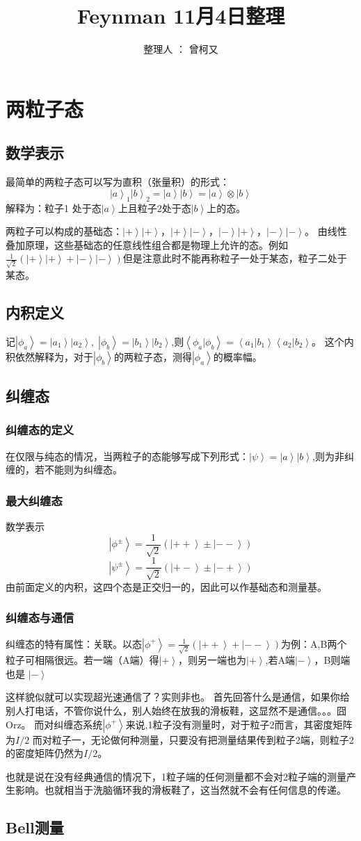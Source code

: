 \documentclass[11pt,a4paper,nocap]{ctexart}
\title{Feynman 11月4日整理}
\author{整理人 ：  曾柯又}
\date{\vspace{-5ex}}
\newcommand{\ket}[1]{\left|#1\right>}
\newcommand{\braket}[2]{\left<#1|#2\right>}
\begin{document}
\maketitle
\section{两粒子态}
\subsection{数学表示}
最简单的两粒子态可以写为直积（张量积）的形式：\[\left|a\right>_1\left|b\right>_2 = \left|a\right>\left|b\right> = \left|a\right>\otimes\left|b\right> \]
解释为：粒子1 处于态\(\left|a\right>\)上且粒子2处于态\(\left|b\right>\)上的态。

两粒子可以构成的基础态：\(\left|+\right>\left|+\right>，\left|+\right>\left|-\right>，\left|-\right>\left|+\right>，\left|-\right>\left|-\right>\)。
由线性叠加原理，这些基础态的任意线性组合都是物理上允许的态。例如\(\frac{1}{\sqrt{2}}(\left|+\right>\left|+\right> + \left|-\right>\left|-\right>)\)但是注意此时不能再称粒子一处于某态，粒子二处于某态。
\subsection{内积定义}
记\(\left|\phi_a\right> = \left|a_1\right>\left|a_2\right>,\;\left|\phi_b\right> = \ket{b_1}\ket{b_2}\),则\(\braket{\phi_a}{\phi_b} = \braket{a_1}{b_1}\braket{a_2}{b_2}\)。
这个内积依然解释为，对于\(\left|\phi_b\right>\)的两粒子态，测得\(\left|\phi_a\right>\)的概率幅。
\subsection{纠缠态}
\subsubsection{纠缠态的定义}
在仅限与纯态的情况，当两粒子的态能够写成下列形式：\(\ket{\psi} = \ket{a}\ket{b}\),则为非纠缠的，若不能则为纠缠态。
\subsubsection{最大纠缠态}
数学表示\[\ket{\phi^\pm} = \frac{1}{\sqrt{2}}(\ket{++} \pm \ket{--})\]
\[\ket{\psi^\pm} = \frac{1}{\sqrt{2}}(\ket{+-} \pm \ket{-+})\]
由前面定义的内积，这四个态是正交归一的，因此可以作基础态和测量基。\\
\subsubsection{纠缠态与通信}
纠缠态的特有属性：关联。以态\(\ket{\phi^+} = \frac{1}{\sqrt{2}}(\ket{++} + \ket{--})\)为例：A,B两个粒子可相隔很远。若一端（A端）得\(\ket{+}\)，则另一端也为\(\ket{+}\),若A端\(\ket{-}\)，B则端也是
\(\ket{-}\)

这样貌似就可以实现超光速通信了？实则非也。
首先回答什么是通信，如果你给别人打电话，不管你说什么，别人始终在放我的滑板鞋，这显然不是通信。。。囧Orz。
而对纠缠态系统\(\ket{\phi^+}\)来说,1粒子没有测量时，对于粒子2而言，其密度矩阵为\(I/2\) 而对粒子一，无论做何种测量，只要没有把测量结果传到粒子2端，则粒子2的密度矩阵仍然为\(I/2\)。

也就是说在没有经典通信的情况下，1粒子端的任何测量都不会对2粒子端的测量产生影响。也就相当于洗脑循环我的滑板鞋了，这当然就不会有任何信息的传递。
\subsection{Bell测量}
\end{document}
